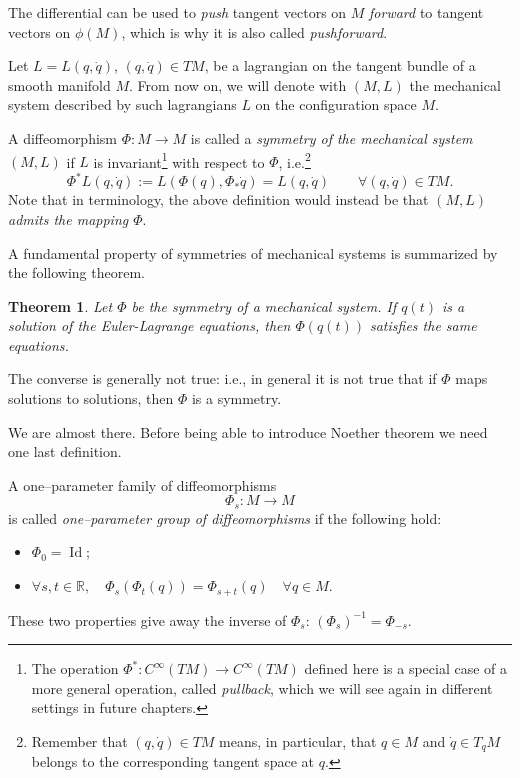 \documentclass[english,fontsize=11pt,paper=b5]{scrbook}
\DeclareMathOperator{\Id}{Id}
\DeclareMathOperator{\Id}{Id}
\newtheorem{theorem}{Theorem}[chapter]
\theoremstyle{definition}
\begin{document}
    The differential can be used to \emph{push} tangent vectors on $M$ \emph{forward} to tangent vectors on $\phi(M)$, which is why it is also called \emph{pushforward}.

    \begin{tcolorbox}
      Let $L = L(q, \dot q)$, $(q, \dot q)\in TM$, be a lagrangian on the tangent bundle of a smooth manifold $M$. From now on, we will denote with $(M, L)$ the mechanical system described by such lagrangians $L$ on the configuration space $M$.
    \end{tcolorbox}

    A diffeomorphism $\Phi: M \to M$ is called a \emph{symmetry of the mechanical system $(M,L)$} if $L$ is invariant\footnote{The operation $\Phi^*:C^\infty(TM) \to C^\infty(TM)$ defined here is a special case of a more general operation, called \emph{pullback}, which we will see again in different settings in future chapters.} with respect to $\Phi$, i.e.\footnote{Remember that $(q,\dot q)\in TM$ means, in particular, that $q\in M$ and $\dot q \in T_q M$ belongs to the corresponding tangent space at $q$.}
    \begin{equation}\label{eq:symmetry}
      \Phi^* L (q,\dot q) := L\left(\Phi(q), \Phi_*\dot q\right) = L(q,\dot q) \qquad \forall (q,\dot q) \in TM.
    \end{equation}
    Note that in \cite[Chapter 4]{book:arnold} terminology, the above definition would instead be that \emph{$(M,L)$ admits the mapping $\Phi$}.

    A fundamental property of symmetries of mechanical systems is summarized by the following theorem.

    \begin{theorem}
      Let $\Phi$ be the symmetry of a mechanical system. If $q(t)$ is a solution of the Euler-Lagrange equations, then $\Phi(q(t))$ satisfies the same equations.
    \end{theorem}

    The converse is generally not true: i.e., in general it is not true that if $\Phi$ maps solutions to solutions, then $\Phi$ is a symmetry.

    We are almost there.
    Before being able to introduce Noether theorem we need one last definition.

    A one--parameter family of diffeomorphisms
    \begin{equation}
      \Phi_s : M \to M
    \end{equation}
    is called \emph{one--parameter group of diffeomorphisms} if the following hold:
    \begin{itemize}
      \item $\Phi_0 = \Id$;
      \item $\forall s, t \in \mathbb{R}, \quad \Phi_s(\Phi_t(q)) = \Phi_{s+t}(q)\quad \forall q\in M$.
    \end{itemize}
    These two properties give away the inverse of $\Phi_s$: $(\Phi_s)^{-1} = \Phi_{-s}$.
\end{document}
